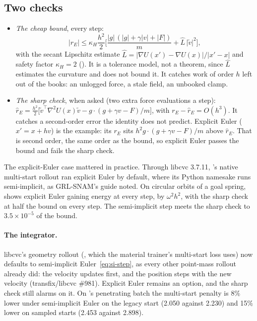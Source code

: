 \documentclass[11pt]{article}
\theoremstyle{remark}
\newcommand{\T}{^{\top}}
\begin{document}
\subsection{Two checks}
\begin{itemize}
  \item \emph{The cheap bound}, every step:
        \begin{equation*}
          \lvert r_E\rvert\le\kappa_H\frac{h^2}2\Big[\frac{\lvert g\rvert\,(\lvert g\rvert+\gamma\lvert v\rvert+\lvert F\rvert)}m
          +\hat L\,\lvert\tilde v\rvert^2\Big],
        \end{equation*}
        with the secant Lipschitz estimate $\hat L=\lvert\nabla U(x')-\nabla U(x)\rvert/\lvert x'-x\rvert$
        and safety factor $\kappa_H=2$ (). It is a tolerance model,
        not a theorem, since $\hat L$ estimates the curvature and does not bound it. It catches
        work of order $h$ left out of the books: an unlogged force, a stale field, an unbooked
        clamp.
  \item \emph{The sharp check}, when asked (two extra force evaluations a step):
        $\hat r_E=\tfrac{h^2}2\big[\tilde v\T\nabla^2U(x)\tilde v-g\cdot(g+\gamma v-F)/m\big]$,
        with $r_E-\hat r_E=O(h^3)$. It catches a second-order error the identity does not predict. Explicit Euler
        ($x'=x+hv$) is the example: its $r_E$ sits $h^2g\cdot(g+\gamma v-F)/m$ above $\hat r_E$.
        That is second order, the same order as the bound, so explicit Euler passes the bound
        and fails the sharp check.
\end{itemize}
The explicit-Euler case mattered in practice. Through libcvc 3.7.11, 's native
multi-start rollout ran explicit Euler by default, where its Python namesake runs semi-implicit, as
GRL-SNAM's guide noted. On circular orbits of a goal spring,
 shows explicit Euler gaining energy at every step,
by $\omega^2h^2$, with the sharp check at half the bound on every step. The semi-implicit step
meets the sharp check to $3.5\times10^{-5}$ of the bound.

\paragraph{The integrator.} libcvc's geometry rollout (, which the
material trainer's multi-start loss uses) now defaults to semi-implicit Euler~\eqref{eq:si-step},
as every other point-mass rollout already did: the velocity updates first, and the position steps
with the new velocity (transfix/libcvc \#981). Explicit Euler remains an option, and the sharp
check still alarms on it. On 's penetrating batch the
multi-start penalty is 8\% lower under semi-implicit Euler on the legacy start (2.050 against
2.230) and 15\% lower on sampled starts (2.453 against 2.898).
\end{document}
